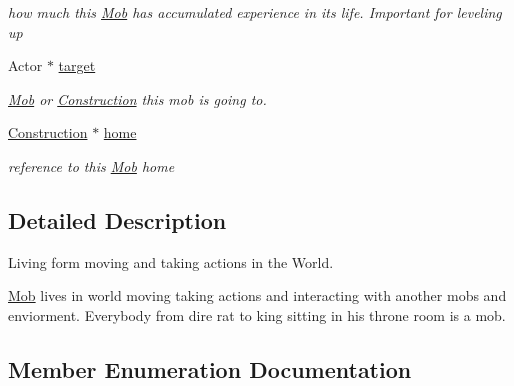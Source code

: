 \begin{DoxyCompactItemize}
\begin{DoxyCompactList}\small\item\em how much this \hyperlink{class_mob}{Mob} has accumulated experience in it\textquotesingle{}s life. Important for leveling up \end{DoxyCompactList}\item 
Actor $\ast$ \hyperlink{class_mob_a1bf86299dea0aa82c773a3b8d04d0593}{target}\hypertarget{class_mob_a1bf86299dea0aa82c773a3b8d04d0593}{}\label{class_mob_a1bf86299dea0aa82c773a3b8d04d0593}

\begin{DoxyCompactList}\small\item\em \hyperlink{class_mob}{Mob} or \hyperlink{class_construction}{Construction} this mob is going to. \end{DoxyCompactList}\item 
\hyperlink{class_construction}{Construction} $\ast$ \hyperlink{class_mob_ad3824bdc42d4041e184201c7801ab35e}{home}\hypertarget{class_mob_ad3824bdc42d4041e184201c7801ab35e}{}\label{class_mob_ad3824bdc42d4041e184201c7801ab35e}

\begin{DoxyCompactList}\small\item\em reference to this \hyperlink{class_mob}{Mob} home \end{DoxyCompactList}\end{DoxyCompactItemize}


\subsection{Detailed Description}
Living form moving and taking actions in the World. 

\hyperlink{class_mob}{Mob} lives in world moving taking actions and interacting with another mobs and enviorment. Everybody from dire rat to king sitting in his throne room is a mob. 

\subsection{Member Enumeration Documentation}
